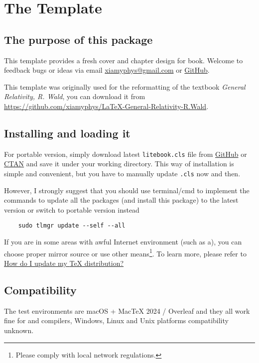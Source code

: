 \chapter{The  Template}

\section{The purpose of this package}
This template provides a fresh cover and chapter design for book. Welcome to feedback bugs or ideas via email \href{mailto:xiamyphys@gmail.com}{\ttfamily xiamyphys@gmail.com} or \href{https://github.com/xiamyphys/fadingimage}{GitHub}.

This template was originally used for the reformatting of the textbook \emph{General Relativity, R. Wald}, you can download it from \url{https://github.com/xiamyphys/LaTeX-General-Relativity-R.Wald}.

\section{Installing  and loading it}
For portable version, simply download latest \verb|litebook.cls| file from \href{https://github.com/xiamyphys/LiteBook}{GitHub} or \href{https://ctan.org/pkg/litebook}{CTAN} and save it under your working directory. This way of installation is simple and convenient, but you have to manually update \verb|.cls| now and then.

However, I strongly suggest that you should use terminal/cmd to implement the commands to update all the packages (and install this package) to the latest version or switch to portable version instead
\begin{verbatim}
    sudo tlmgr update --self --all
\end{verbatim}

If you are in some areas with awful Internet environment (such as a), you can choose proper mirror source or use other means\footnote{Please comply with local network regulations.}. To learn more, please refer to \href{https://tex.stackexchange.com/questions/55437/how-do-i-update-my-tex-distribution}{How do I update my \textsf{\TeX} distribution?}

\section{Compatibility}
The test environments are macOS + Mac\TeX{} 2024 / Overleaf and they all work fine for  and  compilers, Windows, Linux and Unix platforms compatibility unknown.

